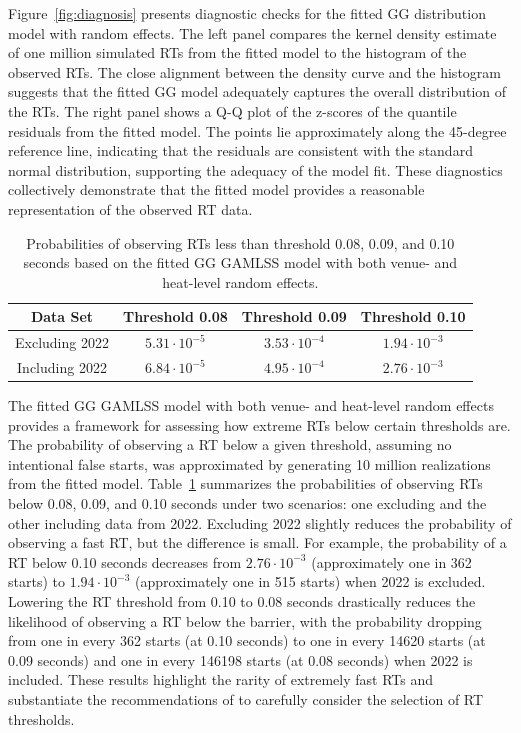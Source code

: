 \documentclass[12pt, letterpaper]{article}
\begin{document}
Figure~\ref{fig:diagnosis} presents diagnostic checks for the fitted
GG distribution model with random effects. The left
panel compares the kernel density estimate of one million simulated RTs
from the fitted model to the histogram of the observed RTs.
The close alignment between the density curve and the histogram suggests that
the fitted GG model adequately captures the overall distribution of the
RTs. The right panel shows a Q-Q plot of the z-scores of the
quantile residuals from the fitted model. The points lie approximately along
the 45-degree reference line, indicating that the residuals are consistent
with the standard normal distribution, supporting the adequacy of the model
fit. These diagnostics collectively demonstrate that the fitted model provides
a reasonable representation of the observed RT data.


\begin{table}
  \centering
  \caption{Probabilities of observing RTs less than threshold 0.08,
  0.09, and 0.10 seconds based on the
    fitted GG GAMLSS model with both venue- and heat-level
random effects.}
  \begin{tabular}{c c c c}
   \toprule
   Data Set & Threshold 0.08 & Threshold 0.09 & Threshold 0.10  \\
   \midrule
   Excluding 2022 & $5.31\cdot10^{-5}$ & $3.53\cdot10^{-4}$ &  $1.94\cdot10^{-3}$  \\
   Including 2022 & $6.84\cdot10^{-5}$ & $4.95\cdot10^{-4}$ & $2.76\cdot10^{-3}$ \\
   \bottomrule
  \end{tabular}
  \label{tab:Sim_probability}
\end{table}


The fitted GG GAMLSS model with both venue- and heat-level
random effects provides a framework for assessing how extreme RTs
below certain thresholds are. The probability of observing a RT
below a given threshold, assuming no intentional false starts, was approximated
by generating 10 million realizations from the fitted model.
Table~\ref{tab:Sim_probability} summarizes the probabilities of observing
RTs below 0.08, 0.09, and 0.10 seconds under two scenarios: one
excluding and the other including data from 2022. Excluding 2022 slightly
reduces the probability of observing a fast RT, but the difference
is small. For example, the probability of a RT below 0.10 seconds
decreases from $2.76 \cdot 10^{-3}$ (approximately one in 362 starts) to
$1.94 \cdot 10^{-3}$ (approximately one in 515 starts) when 2022 is excluded.
Lowering the RT threshold from 0.10 to 0.08 seconds drastically
reduces the likelihood of observing a RT below the barrier, with
the probability dropping from one in every 362 starts (at 0.10 seconds) to one
in every 14620 starts (at 0.09 seconds) and one in every 146198 starts (at 0.08
seconds) when 2022 is included. These results highlight the rarity of extremely
fast RTs and substantiate the recommendations of \citet{komi2009iaaf}
to carefully consider the selection of RT thresholds.
\end{document}
